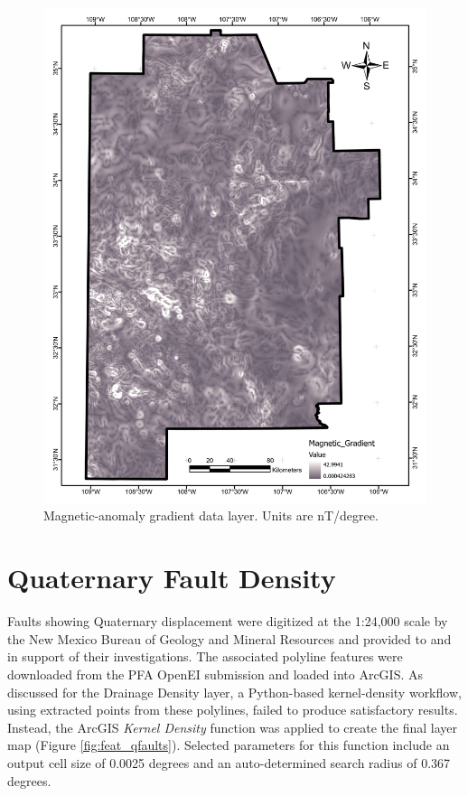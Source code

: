 \begin{figure}[H]
\centering
\includegraphics[width=0.75\linewidth]{templates/images/Figure-MagneticGradient.pdf}
\caption[Magnetic-anomaly gradient data layer]{Magnetic-anomaly gradient data layer. Units are nT/degree.}
\label{fig:feat_magnetic_gradient}
\end{figure}

\section{Quaternary Fault Density}\label{app:dl_quat_fault_density}

Faults showing Quaternary displacement were digitized at the 1:24,000 scale by the New Mexico Bureau of Geology and Mineral Resources and provided to \citet{bielicki_hydrogeolgic_2015} and \citet{pepin_new_2019} in support of their investigations. The associated polyline features were downloaded from the PFA OpenEI submission \citep{kelley_geothermal_2015} and loaded into ArcGIS. As discussed for the Drainage Density layer, a Python-based kernel-density workflow, using extracted points from these polylines, failed to produce satisfactory results. Instead, the ArcGIS \textit{Kernel Density} function was applied to create the final layer map (Figure \ref{fig:feat_qfaults}). Selected parameters for this function include an output cell size of 0.0025 degrees and an auto-determined search radius of 0.367 degrees.

